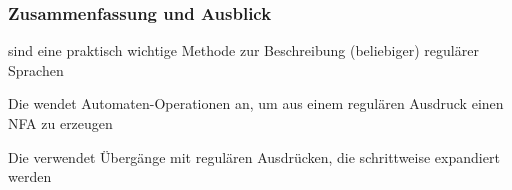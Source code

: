 \documentclass[aspectratio=1610,onlymath]{beamer}
\begin{document}
\begin{frame}\frametitle{Zusammenfassung und Ausblick}

 sind eine praktisch wichtige Methode zur Beschreibung (beliebiger) regulärer Sprachen
\bigskip

Die  wendet Automaten-Operationen an, um aus einem regulären Ausdruck einen
NFA zu erzeugen
\bigskip

Die  verwendet Übergänge mit regulären Ausdrücken, die schrittweise expandiert werden
\bigskip


\end{frame}
\end{document}
